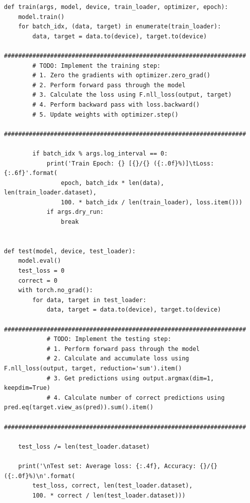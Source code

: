 \documentclass[letter]{article}
\theoremstyle{definition}
\begin{document}
\begin{verbatim}
def train(args, model, device, train_loader, optimizer, epoch):
    model.train()
    for batch_idx, (data, target) in enumerate(train_loader):
        data, target = data.to(device), target.to(device)
        ####################################################################
        # TODO: Implement the training step:
        # 1. Zero the gradients with optimizer.zero_grad()
        # 2. Perform forward pass through the model
        # 3. Calculate the loss using F.nll_loss(output, target)
        # 4. Perform backward pass with loss.backward()
        # 5. Update weights with optimizer.step()
        ####################################################################

        if batch_idx % args.log_interval == 0:
            print('Train Epoch: {} [{}/{} ({:.0f}%)]\tLoss: {:.6f}'.format(
                epoch, batch_idx * len(data), len(train_loader.dataset),
                100. * batch_idx / len(train_loader), loss.item()))
            if args.dry_run:
                break


def test(model, device, test_loader):
    model.eval()
    test_loss = 0
    correct = 0
    with torch.no_grad():
        for data, target in test_loader:
            data, target = data.to(device), target.to(device)
            ####################################################################
            # TODO: Implement the testing step:
            # 1. Perform forward pass through the model
            # 2. Calculate and accumulate loss using F.nll_loss(output, target, reduction='sum').item()
            # 3. Get predictions using output.argmax(dim=1, keepdim=True)
            # 4. Calculate number of correct predictions using pred.eq(target.view_as(pred)).sum().item()
            ####################################################################

    test_loss /= len(test_loader.dataset)

    print('\nTest set: Average loss: {:.4f}, Accuracy: {}/{} ({:.0f}%)\n'.format(
        test_loss, correct, len(test_loader.dataset),
        100. * correct / len(test_loader.dataset)))



\end{verbatim}
\end{document}
